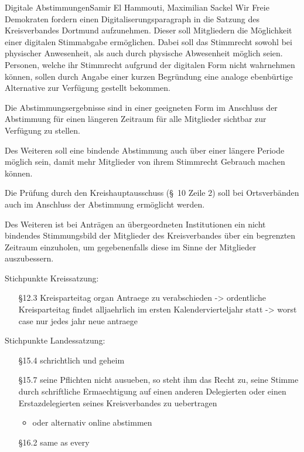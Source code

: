 \documentclass{amendment}
\date{18. August 2020}
\begin{document}
\begin{boxed}{Digitale Abstimmungen}{Samir El Hammouti, Maximilian Sackel}
Wir Freie Demokraten fordern einen Digitaliserungsparagraph in die Satzung des
Kreisverbandes Dortmund aufzunehmen.
Dieser soll Mitgliedern die Möglichkeit einer digitalen Stimmabgabe ermöglichen.
Dabei soll das Stimmrecht sowohl bei physischer Anwesenheit, als auch durch
physische Abwesenheit möglich seien.
Personen, welche ihr Stimmrecht aufgrund der digitalen Form nicht wahrnehmen können,
sollen durch Angabe einer kurzen Begründung eine analoge ebenbürtige Alternative
zur Verfügung gestellt bekommen.

Die Abstimmungsergebnisse sind in einer geeigneten Form im Anschluss der Abstimmung
für einen längeren Zeitraum für alle Mitglieder sichtbar zur Verfügung zu stellen.

Des Weiteren soll eine bindende Abstimmung auch über einer längere Periode möglich
sein, damit mehr Mitglieder von ihrem Stimmrecht Gebrauch machen können.

Die Prüfung durch den Kreishauptausschuss (\S~10 Zeile 2) soll bei Ortsverbänden
auch im Anschluss der Abstimmung ermöglicht werden.

Des Weiteren ist bei Anträgen an übergeordneten Institutionen ein nicht bindendes
Stimmungsbild der Mitglieder des Kreisverbandes über ein begrenzten Zeitraum
einzuholen, um gegebenenfalls diese im Sinne der Mitglieder auszubessern.

Stichpunkte Kreissatzung:
\begin{itemize}
    \item[\S 12.3] Kreisparteitag organ Antraege zu verabschieden -> ordentliche
        Kreisparteitag findet alljaehrlich im ersten Kalendervierteljahr statt
        -> worst case nur jedes jahr neue antraege
\end{itemize}

Stichpunkte Landessatzung:
\begin{itemize}
    \item[\S 15.4] schrichtlich und geheim
    \item[\S 15.7] seine Pflichten nicht ausueben, so steht ihm das Recht zu,
        seine Stimme durch schriftliche Ermaechtigung auf einen anderen
        Delegierten oder einen Erstazdelegierten seines  Kreisverbandes zu
        uebertragen
        \begin{itemize}
            \item oder alternativ online abstimmen
        \end{itemize}
    \item[\S 16.2] same as every
\end{itemize}
\end{boxed}
\end{document}
